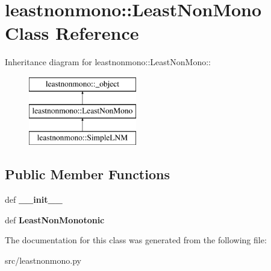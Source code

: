 \hypertarget{classleastnonmono_1_1LeastNonMono}{
\section{leastnonmono::LeastNonMono Class Reference}
\label{da/d81/classleastnonmono_1_1LeastNonMono}
}
Inheritance diagram for leastnonmono::LeastNonMono::\begin{figure}[H]
\begin{center}
\leavevmode
\includegraphics[height=3cm]{da/d81/classleastnonmono_1_1LeastNonMono}
\end{center}
\end{figure}
\subsection*{Public Member Functions}
\begin{DoxyCompactItemize}
\item 
\hypertarget{classleastnonmono_1_1LeastNonMono_ad27a656979919a3cf13907470b53fc2d}{
def {\bfseries \_\-\_\-init\_\-\_\-}}
\label{da/d81/classleastnonmono_1_1LeastNonMono_ad27a656979919a3cf13907470b53fc2d}

\item 
\hypertarget{classleastnonmono_1_1LeastNonMono_ab1899f44db61835de8d8f819a07bf07d}{
def {\bfseries LeastNonMonotonic}}
\label{da/d81/classleastnonmono_1_1LeastNonMono_ab1899f44db61835de8d8f819a07bf07d}

\end{DoxyCompactItemize}


The documentation for this class was generated from the following file:\begin{DoxyCompactItemize}
\item 
src/leastnonmono.py\end{DoxyCompactItemize}
